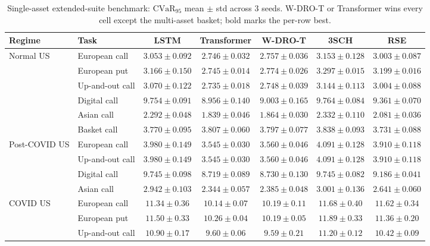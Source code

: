 \documentclass[11pt]{article}
\newcommand{\cvar}{\mathrm{CVaR}}
\begin{document}
\begin{table}[t]
\centering\scriptsize
\caption{Single-asset extended-suite benchmark: $\cvar_{95}$ mean $\pm$ std across $3$ seeds.  W-DRO-T or Transformer wins every cell except the multi-asset basket; bold marks the per-row best.}
\label{tab:headline}
\begin{tabular}{llccccc}
\toprule
Regime & Task & LSTM & Transformer & W-DRO-T & 3SCH & RSE \\\midrule
\multirow{6}{*}{Normal US}
 & European call    & $3.053\pm0.092$ & $\mathbf{2.746\pm0.032}$ & $2.757\pm0.036$ & $3.153\pm0.128$ & $3.003\pm0.087$ \\
 & European put     & $3.166\pm0.150$ & $\mathbf{2.745\pm0.014}$ & $2.774\pm0.026$ & $3.297\pm0.015$ & $3.199\pm0.016$ \\
 & Up-and-out call  & $3.070\pm0.122$ & $\mathbf{2.735\pm0.018}$ & $2.748\pm0.039$ & $3.144\pm0.113$ & $3.004\pm0.088$ \\
 & Digital call     & $9.754\pm0.091$ & $\mathbf{8.956\pm0.140}$ & $9.003\pm0.165$ & $9.764\pm0.084$ & $9.361\pm0.070$ \\
 & Asian call       & $2.292\pm0.048$ & $\mathbf{1.839\pm0.046}$ & $1.864\pm0.030$ & $2.332\pm0.110$ & $2.081\pm0.036$ \\
 & Basket call      & $3.770\pm0.095$ & $3.807\pm0.060$           & $3.797\pm0.077$ & $3.838\pm0.093$ & $\mathbf{3.731\pm0.088}$ \\\midrule
\multirow{4}{*}{Post-COVID US}
 & European call    & $3.980\pm0.149$ & $\mathbf{3.545\pm0.030}$ & $3.560\pm0.046$ & $4.091\pm0.128$ & $3.910\pm0.118$ \\
 & Up-and-out call  & $3.980\pm0.149$ & $\mathbf{3.545\pm0.030}$ & $3.560\pm0.046$ & $4.091\pm0.128$ & $3.910\pm0.118$ \\
 & Digital call     & $9.745\pm0.098$ & $\mathbf{8.719\pm0.089}$ & $8.730\pm0.130$ & $9.745\pm0.082$ & $9.186\pm0.041$ \\
 & Asian call       & $2.942\pm0.103$ & $\mathbf{2.344\pm0.057}$ & $2.385\pm0.048$ & $3.001\pm0.136$ & $2.641\pm0.060$ \\\midrule
\multirow{6}{*}{COVID US}
 & European call    & $11.34\pm0.36$ & $\mathbf{10.14\pm0.07}$ & $10.19\pm0.11$ & $11.68\pm0.40$ & $11.62\pm0.34$ \\
 & European put     & $11.50\pm0.33$ & $10.26\pm0.04$           & $\mathbf{10.19\pm0.05}$ & $11.89\pm0.33$ & $11.36\pm0.20$ \\
 & Up-and-out call  & $10.90\pm0.17$ & $9.60\pm0.06$            & $\mathbf{9.59\pm0.21}$  & $11.20\pm0.12$ & $10.42\pm0.09$ \\

\end{tabular}
\end{table}
\end{document}
